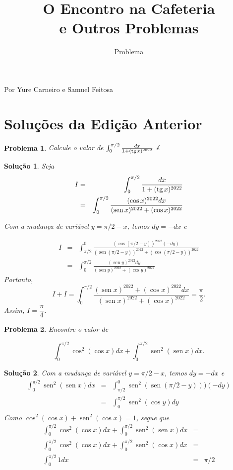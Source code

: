 \documentclass{hipatia}
\title{O Encontro na Cafeteria\\ e Outros Problemas}
\subtitle{Problema}
\DeclareMathOperator{\sen}{sen}
\newtheorem{problem*}{Problema}
\newtheorem*{solution*}{Solução}
\newcommand{\tg}{\mathop{\rm tg}}
\begin{document}
\setcounter{page}{\problemapage}
\maketitle

Por Yure Carneiro e Samuel Feitosa

\section{Soluções da Edição Anterior}

\begin{problem*}
Calcule o valor de $\int_0^{\pi/2} \frac{dx}{1 + (\tg x)^{2022}}$ é
\end{problem*}

\begin{solution*}
Seja 
\begin{eqnarray*}
I & = & \int_0^{\pi/2} \frac{dx}{1 + (\tg x)^{2022}} \\
  & = & \int_0^{\pi/2} \frac{(\cos x)^{2022} dx}{(\sen x)^{2022} + (\cos x)^{2022}}
\end{eqnarray*}

Com a mudança de variável $y=\pi/2-x$, temos $dy = -dx$ e

\begin{eqnarray*}
I & = &  \int_{\pi/2}^0 \frac{(\cos (\pi/2-y))^{2022} (-dy)}{(\sen (\pi/2-y))^{2022} + (\cos (\pi/2-y))^{2022}} \\
& = & \int_0^{\pi/2} \frac{(\sen y)^{2022} dy}{(\sen y)^{2022} + (\cos y)^{2022}}
\end{eqnarray*}
Portanto, 
$$I + I = \int_0^{\pi/2} \frac{(\sen x)^{2022}+(\cos x)^{2022} dx}{(\sen x)^{2022}+(\cos x)^{2022}} = \dfrac{\pi}{2}.$$
Assim, $I=\dfrac{\pi}{4}$.

\end{solution*}

\begin{problem*}
Encontre o valor de 

$$\displaystyle \int_0^{\pi/2} \cos^2 (\cos x)dx + \int_0^{\pi/2} \sen^2 (\sen x)dx .$$

\end{problem*}

\begin{solution*}
Com a mudança de variável $y=\pi/2-x$, temos $dy = -dx$ e 
\begin{eqnarray*}
\int_0^{\pi/2} \sen^2 (\sen x)dx & = & \int_{\pi/2}^{0} \sen^2 (\sen (\pi/2-y)))(-dy) \\
                                & = & \int_{0}^{\pi/2} \sen^2 (\cos y)dy \\
\end{eqnarray*}
\noindent Como $\cos^2 (\cos x)+\sen^2(\cos x)=1$, segue que 
\begin{eqnarray*}
\int_0^{\pi/2} \cos^2 (\cos x)dx + \int_0^{\pi/2} \sen^2 (\sen x)dx & = & \\ 
\int_0^{\pi/2} \cos^2 (\cos x)dx + \int_0^{\pi/2} \sen^2 (\cos x)dx & = & \\
\int_0^{\pi/2} 1 dx & = & \pi/2
\end{eqnarray*}
\end{solution*}
\end{document}

